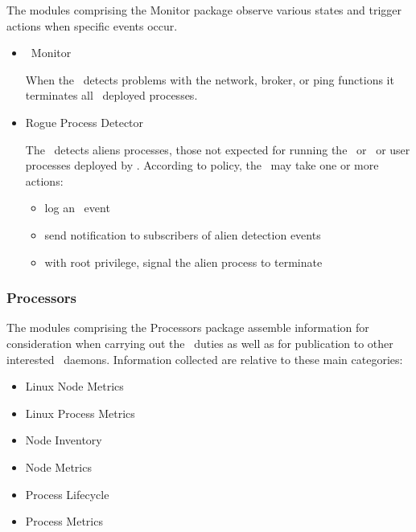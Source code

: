    The modules comprising the Monitor package observe various states and
    trigger actions when specific events occur.
        
    \begin{itemize}
      \item \varAgent~Monitor
      
      When the \varAgent~detects problems with the network, broker, or ping
      functions it terminates all \varAgent~deployed processes.
       
      \item Rogue Process Detector
      
      The \varAgent~detects aliens processes, those not expected for running
      the \varOS~or \varDUCC~or user processes deployed by \varDUCC.
      According to policy, the \varAgent~may take one or more actions:
      \begin{itemize}
        \item log an \varAlienDetected~event
        \item send notification to subscribers of alien detection events
        \item with root privilege, signal the alien process to terminate
      \end{itemize} 
      
    \end{itemize}   
    
    \subsubsection{Processors} 
    
    The modules comprising the Processors package assemble information for
    consideration when carrying out the \varAgent~duties as well as for publication
    to other interested \varDUCC~daemons.  Information collected are relative to
    these main categories:
    
    \begin{itemize}
      \item Linux Node Metrics
      \item Linux Process Metrics
      \item Node Inventory
      \item Node Metrics
      \item Process Lifecycle
      \item Process Metrics
    \end{itemize}   
    
